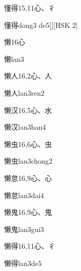\begin{entry}{懂得}{15,11}{⼼、⼻}
  \begin{phonetics}{懂得}{dong3 de5}[][HSK 2]
  \end{phonetics}
\end{entry}

\begin{entry}{懒}{16}{⼼}
  \begin{phonetics}{懒}{lan3}
  \end{phonetics}
\end{entry}

\begin{entry}{懒人}{16,2}{⼼、⼈}
  \begin{phonetics}{懒人}{lan3ren2}
  \end{phonetics}
\end{entry}

\begin{entry}{懒汉}{16,5}{⼼、⽔}
  \begin{phonetics}{懒汉}{lan3han4}
  \end{phonetics}
\end{entry}

\begin{entry}{懒虫}{16,6}{⼼、⾍}
  \begin{phonetics}{懒虫}{lan3chong2}
  \end{phonetics}
\end{entry}

\begin{entry}{懒怠}{16,9}{⼼、⼼}
  \begin{phonetics}{懒怠}{lan3dai4}
  \end{phonetics}
\end{entry}

\begin{entry}{懒鬼}{16,9}{⼼、⿁}
  \begin{phonetics}{懒鬼}{lan3gui3}
  \end{phonetics}
\end{entry}

\begin{entry}{懒得}{16,11}{⼼、⼻}
  \begin{phonetics}{懒得}{lan3de5}
  \end{phonetics}
\end{entry}


